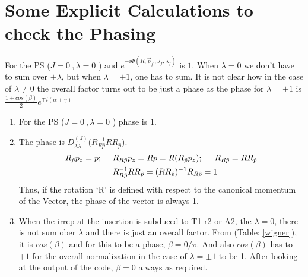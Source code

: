 \documentclass[10pt]{article}
\begin{document}
\section{Some Explicit Calculations to check the Phasing}
For the PS ($J = 0\ ,\lambda = 0$ ) and $e^{-i \Phi(R, \vec{p}_f\,, J_f, \lambda_f)}$ is $1$. When $\lambda = 0$ we don't have to sum over $\pm \lambda$, but when $\lambda = \pm 1$, one has to sum. It is not clear how in the case of $\lambda \ne 0$ the overall factor turns out to be just a phase as the phase for $\lambda = \pm 1$ is $\frac{1 + cos(\beta)}{2}e^{\mp i(\alpha + \gamma)}$
\begin{enumerate}
	\item For the PS ($J = 0\ ,\lambda = 0$ ) phase is $1$. 

	\item The phase is $D^{(J)}_{\lambda\lambda}\big(R^{-1}_{R\hat{p}} R  R_{\hat{p}} \big)$.
\begin{align*}
R_{\hat{p}}p_z = p; \hspace{5mm}  
&R_{R\hat{p}} p_z = Rp = R(R_{\hat{p}}p_z ) ; \hspace{5mm} 
R_{R\hat{p}} = RR_{\hat{p}}\\
&R^{-1}_{R\hat{p}} R  R_{\hat{p}} = (RR_{\hat{p}})^{-1}R_{R\hat{p}} = 1
\end{align*}
Thus, if the rotation `R' is defined with respect to the canonical momentum of the Vector, the phase of the vector is always 1.

	\item When the irrep at the insertion is subduced to T1 r2 or A2, the $\lambda = 0$, there is not sum ober $\lambda$ and there is just an overall factor. From (Table: \ref{wigner}), it is $cos(\beta)$ and for this to be a phase, $\beta = 0/\pi$. And also $cos(\beta)$ has to $+1$ for the overall normalization in the case of $\lambda = \pm 1$ to be 1. After looking at the output of the code, $\beta = 0$ always as required.
	

\end{enumerate}
\end{document}
